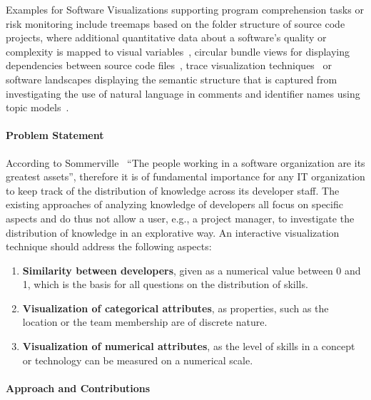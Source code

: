 \documentclass[a4paper,twoside]{article}
\def\eg{e.g.,\xspace}
\begin{document}
Examples for Software Visualizations supporting program comprehension tasks or risk monitoring include treemaps based on the folder structure of source code projects, where additional quantitative data about a software's quality or complexity is mapped to visual variables~\cite{Bohnet2011Monitoring,limberger2019-softwaremap,scheibel2020-treemaptaxonomy}, circular bundle views for displaying dependencies between source code files~\cite{Truemper2012CBV}, trace visualization techniques~\cite{truemper2010trace} or software landscapes displaying the semantic structure that is captured from investigating the use of natural language in comments and identifier names using topic models~\cite{kuhn2008consistentlayout,atzberger2021softwareforest,atzberger2021-softwaregalaxy}.

\paragraph{Problem Statement}
\label{KM:SubSec:Challenges}
According to Sommerville~\cite{sommerville2016softwareengineering} \enquote{The people working in a software organization are its greatest assets}, therefore it is of fundamental importance for any IT organization to keep track of the distribution of knowledge across its developer staff.
The existing approaches of analyzing knowledge of developers all focus on specific aspects and do thus not allow a user, \eg a project manager, to investigate the distribution of knowledge in an explorative way.
An interactive visualization technique should address the following aspects:

\begin{enumerate}
    \item \textbf{Similarity between developers}, given as a numerical value between 0 and 1, which is the basis for all questions on the distribution of skills.
    \item \textbf{Visualization of categorical attributes}, as properties, such as the location or the team membership are of discrete nature.
    \item \textbf{Visualization of numerical attributes}, as the level of skills in a concept or technology can be measured on a numerical scale.
\end{enumerate}

\paragraph{Approach and Contributions}
\label{KM:SubSec:Approach}
\end{document}
